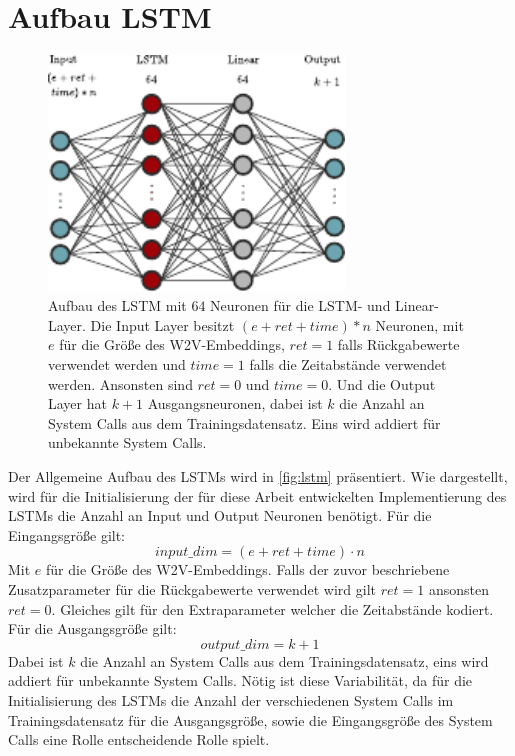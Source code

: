     \section{Aufbau LSTM}\label{sec:aufbau_lstm}
        \begin{figure}[ht]
            \centering
            \includegraphics[width=0.7\textwidth]{images/lstm.pdf}
            \caption{Aufbau des \ac{LSTM} mit $64$ Neuronen für die \ac{LSTM}- und Linear-Layer.
                Die Input Layer besitzt $(e + ret + time) * n$ Neuronen, mit $e$ für die Größe des \ac{W2V}-Embeddings,
                $ret=1$ falls Rückgabewerte verwendet werden und $time=1$ falls die Zeitabstände verwendet werden.
                Ansonsten sind $ret=0$ und $time=0$.
                Und die Output Layer hat $k+1$ Ausgangsneuronen, dabei ist $k$ die Anzahl an System Calls aus dem Trainingsdatensatz.
                Eins wird addiert für unbekannte System Calls.}
                \label{fig:lstm}
        \end{figure}

        Der Allgemeine Aufbau des \acp{LSTM} wird in \autoref{fig:lstm} präsentiert.
        Wie dargestellt, wird für die Initialisierung der für diese Arbeit entwickelten Implementierung des \acp{LSTM} die Anzahl an Input und Output Neuronen benötigt.
        Für die Eingangsgröße gilt:
        \begin{equation}
            input\_dim = (e + ret + time) \cdot n
        \end{equation}
        Mit $e$ für die Größe des \ac{W2V}-Embeddings.
        Falls der zuvor beschriebene Zusatzparameter für die Rückgabewerte verwendet wird gilt $ret=1$ ansonsten $ret=0$.
        Gleiches gilt für den Extraparameter welcher die Zeitabstände kodiert.
        Für die Ausgangsgröße gilt:
        \begin{equation}
            output\_dim = k + 1
        \end{equation}
        Dabei ist $k$ die Anzahl an System Calls aus dem Trainingsdatensatz, eins wird addiert für unbekannte System Calls.
        Nötig ist diese Variabilität, da für die Initialisierung des \acp{LSTM} die Anzahl der verschiedenen System Calls im Trainingsdatensatz für die Ausgangsgröße, sowie die Eingangsgröße des System Calls eine Rolle entscheidende Rolle spielt.

